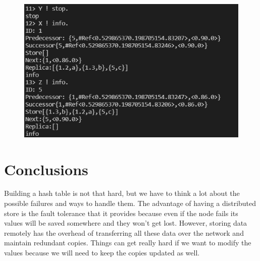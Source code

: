 \documentclass[a4paper, 11pt]{article}
\begin{document}
\begin{figure}
  \begin{center}
    \includegraphics[scale=0.4]{exp3_2.PNG}
    \caption{}
    \label{exp3_2}
  \end{center}
\end{figure}

\section{Conclusions}
Building a hash table is not that hard, but we have to think a lot about the possible failures and ways to handle them. The advantage of having a distributed store is the fault tolerance that it provides because even if the node fails its values will be saved somewhere and they won't get lost. However, storing data remotely has the overhead of transferring all these data over the network and maintain redundant copies. Things can get really hard if we want to modify the values because we will need to keep the copies updated as well.
\end{document}

